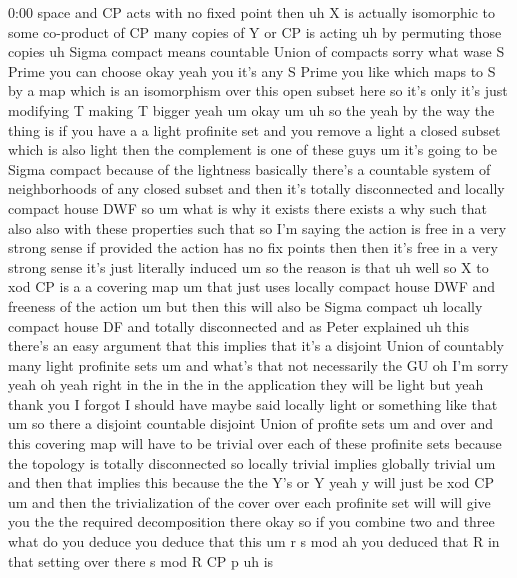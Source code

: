 \begin{unfinished}{0:00}
space  and  CP  acts  with  no  fixed  point
then  uh  X  is  actually  isomorphic  to  some
co-product  of  CP  many  copies  of  Y  or  CP
is  acting  uh  by  permuting  those
copies  uh  Sigma  compact  means  countable
Union  of
compacts  sorry  what  wase  S
Prime  you  can  choose  okay  yeah  you  it's
any  S  Prime  you  like  which  maps  to  S  by
a  map  which  is  an  isomorphism  over  this
open  subset  here  so  it's  only  it's  just
modifying  T  making  T  bigger
yeah  um
okay
um
uh  so  the  yeah  by  the  way  the  thing  is
if  you  have  a  a  light  profinite  set  and
you  remove  a  light  a  closed  subset  which
is  also  light  then  the  complement  is  one
of  these
guys  um  it's  going  to  be  Sigma  compact
because  of  the  lightness  basically
there's  a  countable  system  of
neighborhoods  of  any  closed  subset  and
then  it's  totally  disconnected  and
locally  compact  house  DWF
so
um
what  is  why  it  exists  there  exists  a  why
such  that  also  also  with  these
properties  such
that  so  I'm  saying  the  action  is  free  in
a  very  strong  sense  if  provided  the
action  has  no  fix  points  then  then  it's
free  in  a  very  strong  sense  it's  just
literally
induced
um  so  the  reason  is  that  uh  well  so  X  to
xod  CP  is  a  a  covering
map  um  that  just  uses  locally  compact
house  DWF  and  freeness  of  the  action  um
but  then  this  will  also  be  Sigma
compact  uh  locally  compact  house  DF  and
totally  disconnected  and  as  Peter
explained  uh  this  there's  an  easy
argument  that  this  implies  that  it's  a
disjoint  Union  of  countably  many  light
profinite
sets
um
and  what's
that  not  necessarily  the
GU  oh  I'm  sorry  yeah  oh  yeah  right  in
the  in  the  in  the  application  they  will
be  light  but  yeah  thank  you  I  forgot  I
should  have  maybe  said
locally  light  or  something  like
that  um  so  there  a  disjoint  countable
disjoint  Union  of  profite  sets  um  and
over  and  this  covering  map  will  have  to
be  trivial  over  each  of  these  profinite
sets  because  the  topology  is  totally
disconnected  so  locally  trivial  implies
globally  trivial  um  and  then  that
implies  this  because  the  the  Y's  or
Y  yeah  y  will  just  be  xod  CP  um  and  then
the  trivialization  of  the  cover  over
each  profinite  set  will  will  give  you
the  the  required  decomposition
there
okay  so  if  you  combine  two  and
three  what  do  you  deduce  you  deduce  that
this
um  r  s  mod  ah  you  deduced  that  R  in  that
setting  over  there  s  mod  R  CP  p  uh  is

\end{unfinished}

